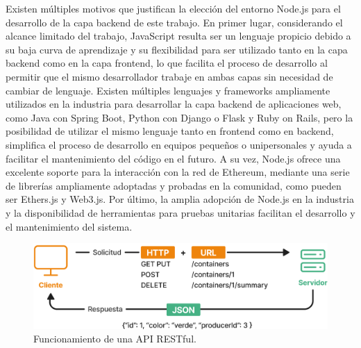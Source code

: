 Existen múltiples motivos que justifican la elección del entorno Node.js para el desarrollo de la capa backend de este trabajo. En primer lugar, considerando el alcance limitado del trabajo, JavaScript resulta ser un lenguaje propicio debido a su baja curva de aprendizaje y su flexibilidad para ser utilizado tanto en la capa backend como en la capa frontend, lo que facilita el proceso de desarrollo al permitir que el mismo desarrollador trabaje en ambas capas sin necesidad de cambiar de lenguaje. Existen múltiples lenguajes y frameworks ampliamente utilizados en la industria para desarrollar la capa backend de aplicaciones web, como Java con Spring Boot, Python con Django o Flask y Ruby on Rails, pero la posibilidad de utilizar el mismo lenguaje tanto en frontend como en backend, simplifica el proceso de desarrollo en equipos pequeños o unipersonales y ayuda a facilitar el mantenimiento del código en el futuro. A su vez, Node.js ofrece una excelente soporte para la interacción con la red de Ethereum, mediante una serie de librerías ampliamente adoptadas y probadas en la comunidad, como pueden ser Ethers.js y Web3.js. Por último, la amplia adopción de Node.js en la industria y la disponibilidad de herramientas para pruebas unitarias facilitan el desarrollo y el mantenimiento del sistema. 

\begin{figure}[!htb]
    \centering
    \includegraphics[width=\linewidth]{Figures/backend-api-rest.png}
    \caption{Funcionamiento de una API RESTful.}
    \label{fig:api-rest}
\end{figure}

